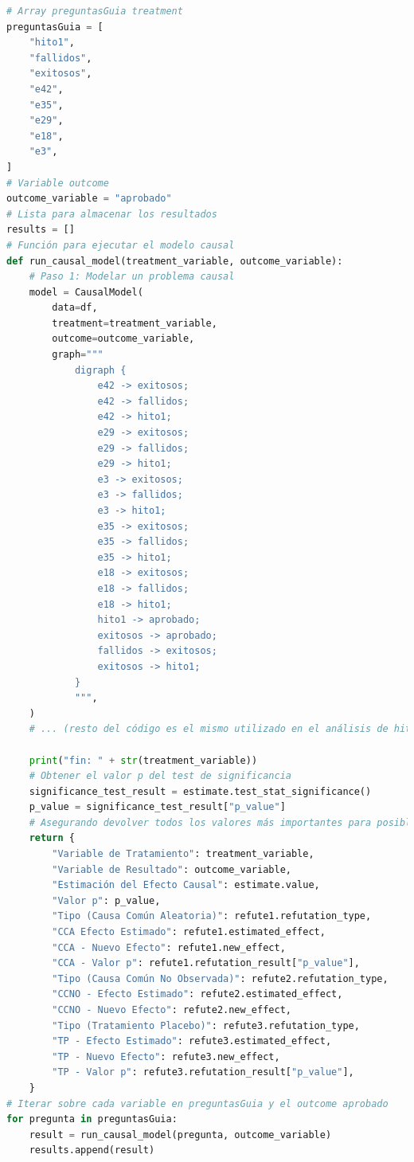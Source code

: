 \begin{lstlisting}[language=Python, caption=Proceso de análisis iterativo, label=lst:analisisIterativo]
# Array preguntasGuia treatment
preguntasGuia = [
    "hito1",
    "fallidos",
    "exitosos",
    "e42",
    "e35",
    "e29",
    "e18",
    "e3",
]
# Variable outcome
outcome_variable = "aprobado"
# Lista para almacenar los resultados
results = []
# Función para ejecutar el modelo causal
def run_causal_model(treatment_variable, outcome_variable):
    # Paso 1: Modelar un problema causal
    model = CausalModel(
        data=df,
        treatment=treatment_variable,
        outcome=outcome_variable,
        graph="""
            digraph {        
                e42 -> exitosos;
                e42 -> fallidos;
                e42 -> hito1;
                e29 -> exitosos;
                e29 -> fallidos;
                e29 -> hito1;
                e3 -> exitosos;
                e3 -> fallidos;
                e3 -> hito1;
                e35 -> exitosos;
                e35 -> fallidos;
                e35 -> hito1;
                e18 -> exitosos;
                e18 -> fallidos;
                e18 -> hito1;
                hito1 -> aprobado;
                exitosos -> aprobado;
                fallidos -> exitosos;
                exitosos -> hito1;
            }
            """,
    )
    # ... (resto del código es el mismo utilizado en el análisis de hito1)

    print("fin: " + str(treatment_variable))
    # Obtener el valor p del test de significancia
    significance_test_result = estimate.test_stat_significance()
    p_value = significance_test_result["p_value"]
    # Asegurando devolver todos los valores más importantes para posibles análisis a futuro
    return {
        "Variable de Tratamiento": treatment_variable,
        "Variable de Resultado": outcome_variable,
        "Estimación del Efecto Causal": estimate.value,
        "Valor p": p_value,
        "Tipo (Causa Común Aleatoria)": refute1.refutation_type,
        "CCA Efecto Estimado": refute1.estimated_effect,
        "CCA - Nuevo Efecto": refute1.new_effect,
        "CCA - Valor p": refute1.refutation_result["p_value"],
        "Tipo (Causa Común No Observada)": refute2.refutation_type,
        "CCNO - Efecto Estimado": refute2.estimated_effect,
        "CCNO - Nuevo Efecto": refute2.new_effect,
        "Tipo (Tratamiento Placebo)": refute3.refutation_type,
        "TP - Efecto Estimado": refute3.estimated_effect,
        "TP - Nuevo Efecto": refute3.new_effect,
        "TP - Valor p": refute3.refutation_result["p_value"],
    }
# Iterar sobre cada variable en preguntasGuia y el outcome aprobado
for pregunta in preguntasGuia:
    result = run_causal_model(pregunta, outcome_variable)
    results.append(result)
\end{lstlisting}

